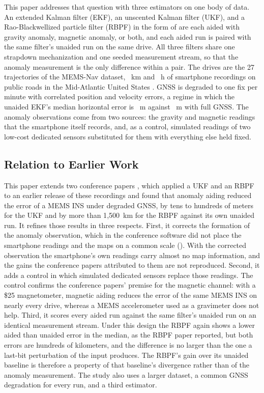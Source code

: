 This paper addresses that question with three estimators on one body of data. An extended Kalman filter (EKF), an unscented Kalman filter (UKF), and a Rao-Blackwellized particle filter (RBPF) in the form of \citet{canciani2017airborne} are each aided with gravity anomaly, magnetic anomaly, or both, and each aided run is paired with the same filter's unaided run on the same drive. All three filters share one strapdown mechanization and one seeded measurement stream, so that the anomaly measurement is the only difference within a pair. The drives are the 27 trajectories of the MEMS-Nav dataset, \numdatasetkm~km and \numdatasethours~h of smartphone recordings on public roads in the Mid-Atlantic United States \citep{mems-nav-dataset}. GNSS is degraded to one fix per minute with correlated position and velocity errors, a regime in which the unaided EKF's median horizontal error is \numekfdegradedmedian~m against \numekffullmedian~m with full GNSS. The anomaly observations come from two sources: the gravity and magnetic readings that the smartphone itself records, and, as a control, simulated readings of two low-cost dedicated sensors substituted for them with everything else held fixed.

\subsection{Relation to Earlier Work}

This paper extends two conference papers \citep{anom-ukf,anom-pf}, which applied a UKF and an RBPF to an earlier release of these recordings and found that anomaly aiding reduced the error of a MEMS INS under degraded GNSS, by tens to hundreds of meters for the UKF and by more than 1{,}500~km for the RBPF against its own unaided run. It refines those results in three respects. First, it corrects the formation of the anomaly observation, which in the conference software did not place the smartphone readings and the maps on a common scale (). With the corrected observation the smartphone's own readings carry almost no map information, and the gains the conference papers attributed to them are not reproduced. Second, it adds a control in which simulated dedicated sensors replace those readings. The control confirms the conference papers' premise for the magnetic channel: with a \$25 magnetometer, magnetic aiding reduces the error of the same MEMS INS on nearly every drive, whereas a MEMS accelerometer used as a gravimeter does not help. Third, it scores every aided run against the same filter's unaided run on an identical measurement stream. Under this design the RBPF again shows a lower aided than unaided error in the median, as the RBPF paper reported, but both errors are hundreds of kilometers, and the difference is no larger than the one a last-bit perturbation of the input produces. The RBPF's gain over its unaided baseline is therefore a property of that baseline's divergence rather than of the anomaly measurement. The study also uses a larger dataset, a common GNSS degradation for every run, and a third estimator.

